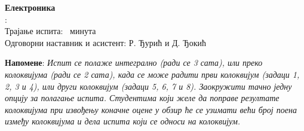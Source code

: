 \documentclass[10pt, a4paper, twoside]{article}
\begin{document}
\noindent
\begin{minipage}[t]{0.5\textwidth}
\begin{flushleft}
\vspace*{0pt}
{\large \textbf{Електроника}} \\[2mm]
: \datumIspita \\
Трајање испита: \trajanjeIspita\ минута \\
Одговорни наставник и асистент: Р. Ђурић и Д. Ђокић
\end{flushleft}
\end{minipage}
\hfill
\begin{minipage}[t]{0.5\textwidth}
\vspace*{0pt}
\end{minipage}

\vspace*{2.5mm}

\noindent
\textbf{Напомене}: 
\textit{Испит се полаже интегрално (ради се 3 сата), или преко колоквијума (ради се 2 сата), када се може радити први
колоквијум (задаци 1, 2, 3 и 4), или други колоквијум (задаци 5, 6, 7 и 8). 
Заокружити тачно једну опцију за полагање испита.
Студентима који желе да поправе резултате колоквијума 
при извођењу коначне оцене
у обзир ће се узимати већи број поена између колоквијума 
и дела испита који се односи на
колоквијум. 
} \vspace*{2mm}
\end{document}
